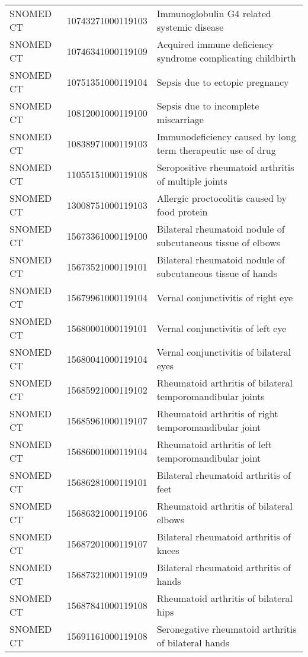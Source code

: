 \begin{longtable}{p{}p{}p{}}
  SNOMED CT & 10743271000119103 & Immunoglobulin G4 related systemic disease \\ 
  SNOMED CT & 10746341000119109 & Acquired immune deficiency syndrome complicating childbirth \\ 
  SNOMED CT & 10751351000119104 & Sepsis due to ectopic pregnancy \\ 
  SNOMED CT & 10812001000119100 & Sepsis due to incomplete miscarriage \\ 
  SNOMED CT & 10838971000119103 & Immunodeficiency caused by long term therapeutic use of drug \\ 
  SNOMED CT & 11055151000119108 & Seropositive rheumatoid arthritis of multiple joints \\ 
  SNOMED CT & 13008751000119103 & Allergic proctocolitis caused by food protein \\ 
  SNOMED CT & 15673361000119100 & Bilateral rheumatoid nodule of subcutaneous tissue of elbows \\ 
  SNOMED CT & 15673521000119101 & Bilateral rheumatoid nodule of subcutaneous tissue of hands \\ 
  SNOMED CT & 15679961000119104 & Vernal conjunctivitis of right eye \\ 
  SNOMED CT & 15680001000119101 & Vernal conjunctivitis of left eye \\ 
  SNOMED CT & 15680041000119104 & Vernal conjunctivitis of bilateral eyes \\ 
  SNOMED CT & 15685921000119102 & Rheumatoid arthritis of bilateral temporomandibular joints \\ 
  SNOMED CT & 15685961000119107 & Rheumatoid arthritis of right temporomandibular joint \\ 
  SNOMED CT & 15686001000119104 & Rheumatoid arthritis of left temporomandibular joint \\ 
  SNOMED CT & 15686281000119101 & Bilateral rheumatoid arthritis of feet \\ 
  SNOMED CT & 15686321000119106 & Rheumatoid arthritis of bilateral elbows \\ 
  SNOMED CT & 15687201000119107 & Bilateral rheumatoid arthritis of knees \\ 
  SNOMED CT & 15687321000119109 & Bilateral rheumatoid arthritis of hands \\ 
  SNOMED CT & 15687841000119108 & Rheumatoid arthritis of bilateral hips \\ 
  SNOMED CT & 15691161000119108 & Seronegative rheumatoid arthritis of bilateral hands \\ 

\end{longtable}
